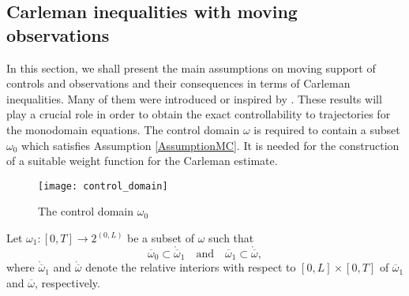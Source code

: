 \documentclass[10pt]{article}
\def\om{\omega}
\begin{document}

\subsection{Carleman inequalities with moving observations}

    { In this section, we shall present the main assumptions on moving support of controls and observations and
    their consequences  in terms of Carleman inequalities. Many of them were introduced or  inspired by
    \cite{ALBANO,imanuvilov96,zuazua_memory,CSZR,CSSOUZA,BFCG,martin_rosier_moving}. These results will play a crucial role in order to obtain the exact controllability to trajectories for the monodomain equations.
 The control domain $\omega$ is required to contain  a subset $\omega_0$ which satisfies Assumption \ref{AssumptionMC}. It is  needed for the construction of a suitable weight function for the Carleman estimate.
\begin{figure}[h]
    \centering\texttt{[image: control\_domain]}
    \caption{The control domain $\om_0$}\label{FIG1}
\end{figure}
}

	Let $\om_1:[0,T]\rightarrow 2^{(0,L)}$ be a subset of $\om$ such that
\begin{equation}\label{eq:om1om0}
	{\overline{\om}_0\subset
	\mathring{\overline{\om}}_1\quad\text{and}\quad\overline{\om}_1\subset
	\mathring{\overline{\om}}},
\end{equation}	
	where $\mathring{\overline{\om}}_1$ and $\mathring{\overline{\om}}$ denote the relative interiors with respect
	to $[0,L]\times[0,T]$ of ${\overline{\om}_1}$ and ${\overline{\om}}$, respectively.
\end{document}
